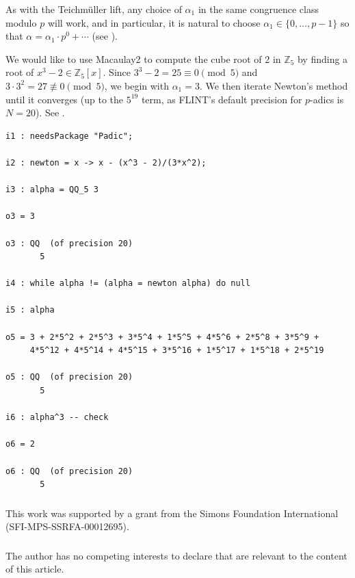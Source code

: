 \documentclass[runningheads]{llncs}
\newcommand{\ZZ}{\mathbb Z}
\begin{document}
As with the Teichm\"uller lift, any choice of $\alpha_1$ in the same congruence class modulo $p$ will work, and in particular, it is natural to choose $\alpha_1\in\{0,\ldots,p-1\}$ so that $\alpha = \alpha_1\cdot p^0 + \cdots$ (see ).

We would like to use Macaulay2 to compute the cube root of 2 in $\ZZ_5$ by finding a root of $x^3-2\in\ZZ_5[x]$.  Since $3^3-2=25\equiv 0\pmod 5$ and $3\cdot 3^2 = 27\not\equiv 0\pmod 5$, we begin with $\alpha_1 = 3$.  We then iterate Newton's method until it converges (up to the $5^{19}$ term, as FLINT's default precision for $p$-adics is $N=20$).  See .

\begin{listing}[htbp!]
\begin{verbatim}
i1 : needsPackage "Padic";

i2 : newton = x -> x - (x^3 - 2)/(3*x^2);

i3 : alpha = QQ_5 3

o3 = 3

o3 : QQ  (of precision 20)
       5

i4 : while alpha != (alpha = newton alpha) do null

i5 : alpha

o5 = 3 + 2*5^2 + 2*5^3 + 3*5^4 + 1*5^5 + 4*5^6 + 2*5^8 + 3*5^9 +
     4*5^12 + 4*5^14 + 4*5^15 + 3*5^16 + 1*5^17 + 1*5^18 + 2*5^19

o5 : QQ  (of precision 20)
       5

i6 : alpha^3 -- check

o6 = 2

o6 : QQ  (of precision 20)
       5
\end{verbatim}
\caption{Computing the cube root of 2 in $\ZZ_5$ using Macaulay2}
\label{hensel lemma example code}
\end{listing}


\begin{credits}
  \subsubsection{\ackname} This work was supported by a grant from the Simons Foundation International (SFI-MPS-SSRFA-00012695).

\subsubsection{\discintname}
The author has no competing interests to declare that are
relevant to the content of this article.
\end{credits}
%
%
%


\end{document}
